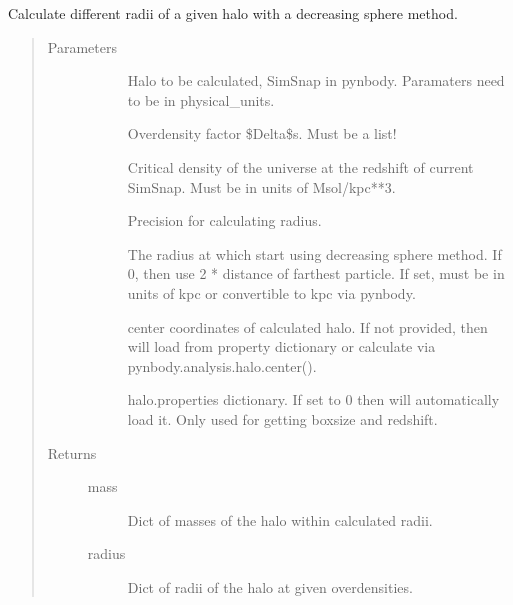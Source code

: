 \documentclass[letterpaper,10pt,english]{sphinxmanual}
\begin{document}
\begin{fulllineitems}
\label{\detokenize{calculate_R:modules.calculate_R.get_radius}}
Calculate different radii of a given halo with a decreasing sphere method.
\begin{quote}\begin{description}
\item[{Parameters}] \leavevmode\begin{description}
\item[{}] \leavevmode
Halo to be calculated, SimSnap in pynbody. 
Paramaters need to be in physical\_units.

\item[{}] \leavevmode
Overdensity factor \$Delta\$s. Must be a 
list!

\item[{}] \leavevmode
Critical density of the universe at the 
redshift of current SimSnap. Must be in 
units of Msol/kpc**3.

\item[{}] \leavevmode
Precision for calculating radius.

\item[{}] \leavevmode
The radius at which start using decreasing sphere 
method. If 0, then use 2 * distance of 
farthest particle. If set, must be in units of 
kpc or convertible to kpc via pynbody.

\item[{}] \leavevmode
center coordinates of calculated halo. If not provided, 
then will load from property dictionary or calculate 
via pynbody.analysis.halo.center().

\item[{}] \leavevmode
halo.properties dictionary. If set to 0 then will 
automatically load it. Only used for getting boxsize 
and redshift.

\end{description}

\item[{Returns}] \leavevmode\begin{description}
\item[{mass}] \leavevmode
Dict of masses of the halo within calculated radii.

\item[{radius}] \leavevmode
Dict of radii of the halo at given overdensities.

\end{description}

\end{description}\end{quote}

\end{fulllineitems}
\end{document}
